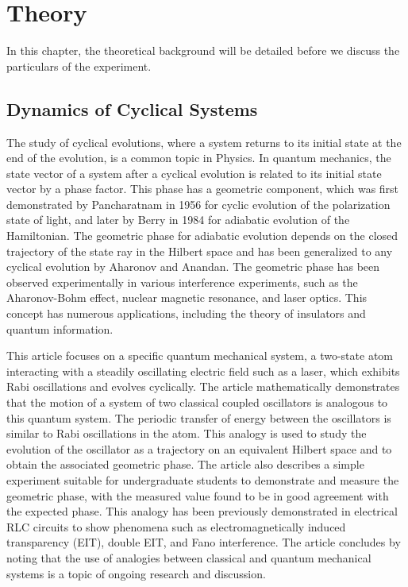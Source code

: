 \chapter{\label{method}Theory}
In this chapter, the theoretical background will be detailed before we discuss the particulars of the experiment.
\section{Dynamics of Cyclical Systems}
The study of cyclical evolutions, where a system returns to its initial state at the end of the evolution, is a common topic in Physics. In quantum mechanics, the state vector of a system after a cyclical evolution is related to its initial state vector by a phase factor. This phase has a geometric component, which was first demonstrated by Pancharatnam in 1956 for cyclic evolution of the polarization state of light, and later by Berry in 1984 for adiabatic evolution of the Hamiltonian. The geometric phase for adiabatic evolution depends on the closed trajectory of the state ray in the Hilbert space and has been generalized to any cyclical evolution by Aharonov and Anandan. The geometric phase has been observed experimentally in various interference experiments, such as the Aharonov-Bohm effect, nuclear magnetic resonance, and laser optics. This concept has numerous applications, including the theory of insulators and quantum information.

This article focuses on a specific quantum mechanical system, a two-state atom interacting with a steadily oscillating electric field such as a laser, which exhibits Rabi oscillations and evolves cyclically. The article mathematically demonstrates that the motion of a system of two classical coupled oscillators is analogous to this quantum system. The periodic transfer of energy between the oscillators is similar to Rabi oscillations in the atom. This analogy is used to study the evolution of the oscillator as a trajectory on an equivalent Hilbert space and to obtain the associated geometric phase. The article also describes a simple experiment suitable for undergraduate students to demonstrate and measure the geometric phase, with the measured value found to be in good agreement with the expected phase. This analogy has been previously demonstrated in electrical RLC circuits to show phenomena such as electromagnetically induced transparency (EIT), double EIT, and Fano interference. The article concludes by noting that the use of analogies between classical and quantum mechanical systems is a topic of ongoing research and discussion.

